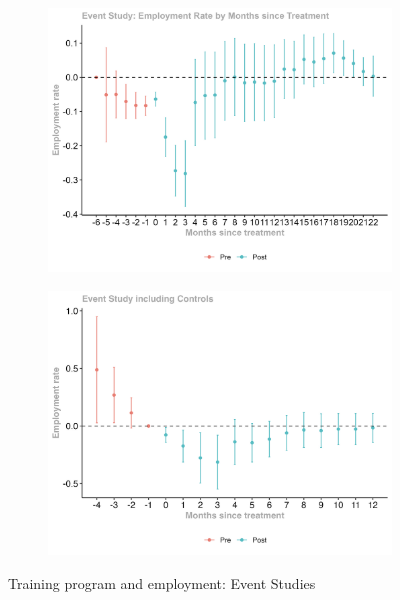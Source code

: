 \documentclass{scrartcl}
\begin{document}
\begin{figure}[h!]
  \centering
  
  \begin{subfigure}[t]{0.48\textwidth}
    \centering
    \includegraphics[width=\linewidth]{output/figures/final_event_study_employment_rate.jpg}
    \label{fig:event_study}
  \end{subfigure}
  \hfill
  \begin{subfigure}[t]{0.48\textwidth}
    \centering
    \includegraphics[width=\linewidth]{output/figures/final_event_study_employment_rate_controls.jpg}
    \label{fig:event_study_controls}
  \end{subfigure}

  \caption{Training program and employment: Event Studies}
  \label{fig:}
\end{figure}
\end{document}
